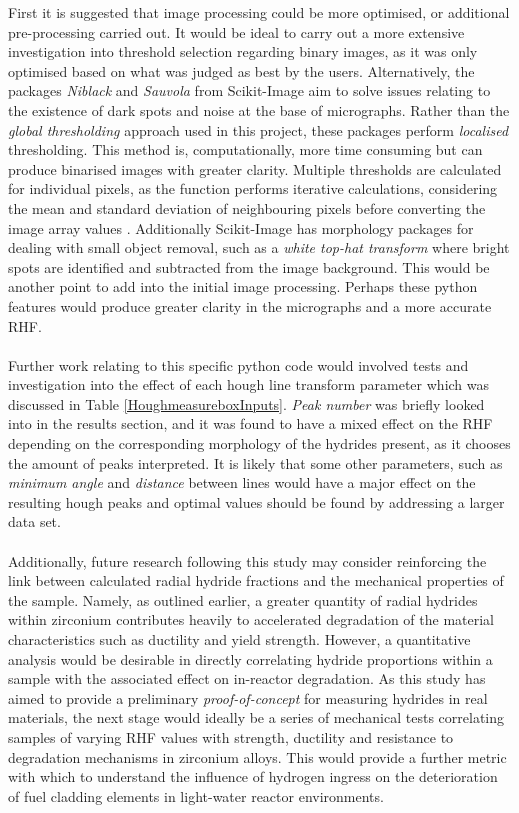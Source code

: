 \documentclass{article}
\begin{document}
First it is suggested that image processing could be more optimised, or additional pre-processing carried out. It would be ideal to carry out a more extensive investigation into threshold selection regarding binary images, as it was only optimised based on what was judged as best by the users. Alternatively, the packages \textit{Niblack} and \textit{Sauvola} from Scikit-Image aim to solve issues relating to the existence of dark spots and noise at the base of micrographs. Rather than the \textit{global thresholding} approach used in this project, these packages perform \textit{localised} thresholding. This method is, computationally, more time consuming but can produce binarised images with greater clarity. Multiple thresholds are calculated for individual pixels, as the function performs iterative calculations, considering the mean and standard deviation of neighbouring pixels before converting the image array values \cite{ScikitimageC}. Additionally Scikit-Image has morphology packages for dealing with small object removal, such as a \textit{white top-hat transform} where bright spots are identified and subtracted from the image background. This would be another point to add into the initial image processing. Perhaps these python features would produce greater clarity in the micrographs and a more accurate RHF.
\\
\\
Further work relating to this specific python code would involved tests and investigation into the effect of each hough line transform parameter which was discussed in Table \ref{HoughmeasureboxInputs}. \textit{Peak number} was briefly looked into in the results section, and it was found to have a mixed effect on the RHF depending on the corresponding morphology of the hydrides present, as it chooses the amount of peaks interpreted. It is likely that some other parameters, such as \textit{minimum angle} and \textit{distance} between lines would have a major effect on the resulting hough peaks and optimal values should be found by addressing a larger data set.
\\
\\
Additionally, future research following this study may consider reinforcing the link between calculated radial hydride fractions and the mechanical properties of the sample. Namely, as outlined earlier, a greater quantity of radial hydrides within zirconium contributes heavily to accelerated degradation of the material characteristics such as ductility and yield strength. However, a quantitative analysis would be desirable in directly correlating hydride proportions within a sample with the associated effect on in-reactor degradation. As this study has aimed to provide a preliminary \textit{proof-of-concept} for measuring hydrides in real materials, the next stage would ideally be a series of mechanical tests correlating samples of varying RHF values with strength, ductility and resistance to degradation mechanisms in zirconium alloys. This would provide a further metric with which to understand the influence of hydrogen ingress on the deterioration of fuel cladding elements in light-water reactor environments.
\end{document}
